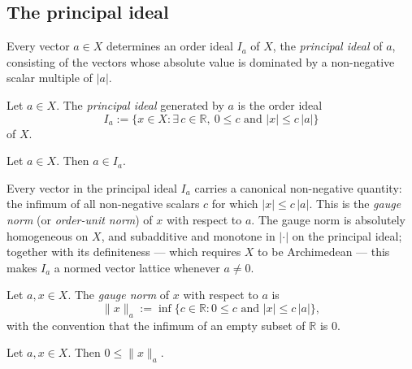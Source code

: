\subsection{The principal ideal}

Every vector $a \in X$ determines an order ideal $I_a$ of $X$, the
\emph{principal ideal} of $a$, consisting of the vectors whose
absolute value is dominated by a non-negative scalar multiple of
$\lvert a \rvert$.

\begin{definition}
\label{def:orderIdeal-principal}
\leanok
{}
Let $a \in X$. The \emph{principal ideal} generated by $a$ is the
order ideal
\[
  I_a := \{x \in X : \exists\, c \in \mathbb{R},\ 0 \le c \text{ and }
    \lvert x \rvert \le c\,\lvert a \rvert\}
\]
of $X$.
\end{definition}

\begin{lemma}
\label{lem:orderIdeal-self-mem-principal}
\leanok
{}
Let $a \in X$. Then $a \in I_a$.
\end{lemma}

Every vector in the principal ideal $I_a$ carries a canonical
non-negative quantity: the infimum of all non-negative scalars
$c$ for which $\lvert x \rvert \le c\,\lvert a \rvert$. This is the
\emph{gauge norm} (or \emph{order-unit norm}) of $x$ with respect to
$a$. The gauge norm is absolutely homogeneous on $X$, and
subadditive and monotone in $\lvert \cdot \rvert$ on the principal
ideal; together with its definiteness — which requires $X$ to be
Archimedean — this makes $I_a$ a normed vector lattice whenever
$a \ne 0$.

\begin{definition}
\label{def:orderIdeal-gaugeNorm}
\leanok
{}
Let $a, x \in X$. The \emph{gauge norm} of $x$ with respect to $a$
is
\[
  \lVert x \rVert_a := \inf\{c \in \mathbb{R} : 0 \le c \text{ and }
    \lvert x \rvert \le c\,\lvert a \rvert\},
\]
with the convention that the infimum of an empty subset of
$\mathbb{R}$ is $0$.
\end{definition}

\begin{lemma}
\label{lem:orderIdeal-gaugeNorm-nonneg}
\leanok
{}
Let $a, x \in X$. Then $0 \le \lVert x \rVert_a$.
\end{lemma}

